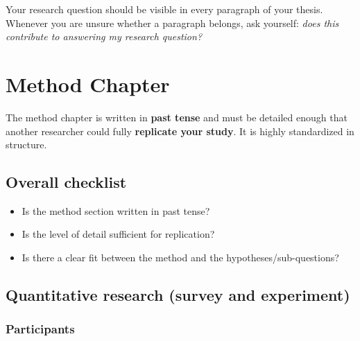 \documentclass[
  11pt,
  a4paper,
]{scrbook}
\providecommand{\tightlist}{%
  \setlength{\itemsep}{0pt}\setlength{\parskip}{0pt}}\usepackage{longtable,booktabs,array}
\begin{document}
\begin{tcolorbox}[enhanced jigsaw, bottomrule=.15mm, opacityback=0, toprule=.15mm, colframe=quarto-callout-tip-color-frame, left=2mm, rightrule=.15mm, title=\textcolor{quarto-callout-tip-color}{\faLightbulb}\hspace{0.5em}{The golden thread}, colbacktitle=quarto-callout-tip-color!10!white, bottomtitle=1mm, colback=white, breakable, toptitle=1mm, titlerule=0mm, leftrule=.75mm, arc=.35mm, opacitybacktitle=0.6, coltitle=black]

Your research question should be visible in every paragraph of your
thesis. Whenever you are unsure whether a paragraph belongs, ask
yourself: \emph{does this contribute to answering my research question?}

\end{tcolorbox}

\chapter{Method Chapter}\label{method-chapter}

The method chapter is written in \textbf{past tense} and must be
detailed enough that another researcher could fully \textbf{replicate
your study}. It is highly standardized in structure.

\section{Overall checklist}\label{overall-checklist}

\begin{itemize}
\tightlist
\item[$\square$]
  Is the method section written in past tense?
\item[$\square$]
  Is the level of detail sufficient for replication?
\item[$\square$]
  Is there a clear fit between the method and the
  hypotheses/sub-questions?
\end{itemize}

\section{Quantitative research (survey and
experiment)}\label{quantitative-research-survey-and-experiment}

\subsection{Participants}\label{participants}
\end{document}
